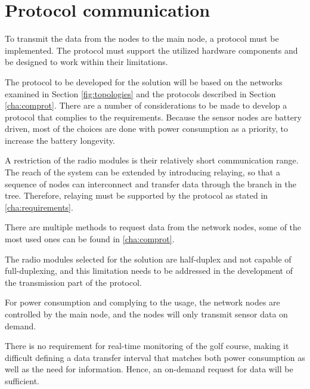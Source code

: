 \section{Protocol communication}\label{cha:protocolDesign}
To transmit the data from the nodes to the main node, a protocol must be implemented.
The protocol must support the utilized hardware components and be designed to work within their limitations. 

The protocol to be developed for the solution will be based on the networks examined in Section \ref{fig:topologies} and the protocols described in Section \ref{cha:comprot}.
There are a number of considerations to be made to develop a protocol that complies to the requirements.
Because the sensor nodes are battery driven, most of the choices are done with power consumption as a priority, to increase the battery longevity.

A restriction of the radio modules is their relatively short communication range. The reach of the system can be extended by introducing relaying, so that a sequence of nodes can interconnect and transfer data through the branch in the tree. Therefore, relaying must be supported by the protocol as stated in \ref{cha:requirements}. 

There are multiple methods to request data from the network nodes, some of the most used ones can be found in \ref{cha:comprot}. 

The radio modules selected for the solution are half-duplex and not capable of full-duplexing, and this limitation needs to be addressed in the development of the transmission part of the protocol. 

For power consumption and complying to the usage, the network nodes are controlled by the main node, and the nodes will only transmit sensor data on demand.

There is no requirement for real-time monitoring of the golf course, making it difficult defining a data transfer interval that matches both power consumption as well as the need for information.
Hence, an on-demand request for data will be sufficient.

